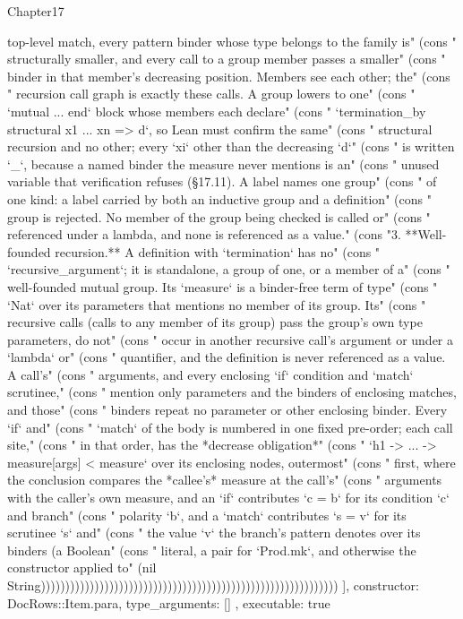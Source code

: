 \begin{lexlean}{Chapter17}
\begin{semanticmodule}
{{top-level match, every pattern binder whose type belongs to the family is" (cons "   structurally smaller, and every call to a group member passes a smaller" (cons "   binder in that member's decreasing position. Members see each other; the" (cons "   recursion call graph is exactly these calls. A group lowers to one" (cons "   `mutual ... end` block whose members each declare" (cons "   `termination_by structural x1 ... xn => d`, so Lean must confirm the same" (cons "   structural recursion and no other; every `xi` other than the decreasing `d`" (cons "   is written `_`, because a named binder the measure never mentions is an" (cons "   unused variable that verification refuses (§17.11). A label names one group" (cons "   of one kind: a label carried by both an inductive group and a definition" (cons "   group is rejected. No member of the group being checked is called or" (cons "   referenced under a lambda, and none is referenced as a value." (cons "3. **Well-founded recursion.** A definition with `termination` has no" (cons "   `recursive_argument`; it is standalone, a group of one, or a member of a" (cons "   well-founded mutual group. Its `measure` is a binder-free term of type" (cons "   `Nat` over its parameters that mentions no member of its group. Its" (cons "   recursive calls (calls to any member of its group) pass the group's own type parameters, do not" (cons "   occur in another recursive call's argument or under a `lambda` or" (cons "   quantifier, and the definition is never referenced as a value. A call's" (cons "   arguments, and every enclosing `if` condition and `match` scrutinee," (cons "   mention only parameters and the binders of enclosing matches, and those" (cons "   binders repeat no parameter or other enclosing binder. Every `if` and" (cons "   `match` of the body is numbered in one fixed pre-order; each call site," (cons "   in that order, has the *decrease obligation*" (cons "   `h1 -> ... -> measure[args] < measure` over its enclosing nodes, outermost" (cons "   first, where the conclusion compares the *callee's* measure at the call's" (cons "   arguments with the caller's own measure, and an `if` contributes `c = b` for its condition `c` and branch" (cons "   polarity `b`, and a `match` contributes `s = v` for its scrutinee `s` and" (cons "   the value `v` the branch's pattern denotes over its binders (a Boolean" (cons "   literal, a pair for `Prod.mk`, and otherwise the constructor applied to" (nil String)))))))))))))))))))))))))))))))))))))))))))))))))))))))))))))
    ],
    constructor: DocRows::Item.para,
    type_arguments: []
  },
  executable: true
}


\end{semanticmodule}
\end{lexlean}
